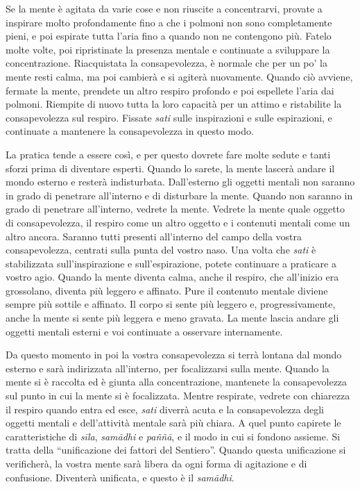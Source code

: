 Se la mente è agitata da varie cose e non riuscite a concentrarvi,
provate a inspirare molto profondamente fino a che i polmoni non sono
completamente pieni, e poi espirate tutta l'aria fino a quando non ne
contengono più. Fatelo molte volte, poi ripristinate la presenza mentale
e continuate a sviluppare la concentrazione. Riacquistata la
consapevolezza, è normale che per un po' la mente resti calma, ma poi
cambierà e si agiterà nuovamente. Quando ciò avviene, fermate la mente,
prendete un altro respiro profondo e poi espellete l'aria dai polmoni.
Riempite di nuovo tutta la loro capacità per un attimo e ristabilite la
consapevolezza sul respiro. Fissate \emph{sati} sulle inspirazioni e
sulle espirazioni, e continuate a mantenere la consapevolezza in questo
modo.

La pratica tende a essere così, e per questo dovrete fare molte sedute e
tanti sforzi prima di diventare esperti. Quando lo sarete, la mente
lascerà andare il mondo esterno e resterà indisturbata. Dall'esterno gli
oggetti mentali non saranno in grado di penetrare all'interno e di
disturbare la mente. Quando non saranno in grado di penetrare
all'interno, vedrete la mente. Vedrete la mente quale oggetto di
consapevolezza, il respiro come un altro oggetto e i contenuti mentali
come un altro ancora. Saranno tutti presenti all'interno del campo della
vostra consapevolezza, centrati sulla punta del vostro naso. Una volta
che \emph{sati} è stabilizzata sull'inspirazione e sull'espirazione,
potete continuare a praticare a vostro agio. Quando la mente diventa
calma, anche il respiro, che all'inizio era grossolano, diventa più
leggero e affinato. Pure il contenuto mentale diviene sempre più sottile
e affinato. Il corpo si sente più leggero e, progressivamente, anche la
mente si sente più leggera e meno gravata. La mente lascia andare gli
oggetti mentali esterni e voi continuate a osservare internamente.

Da questo momento in poi la vostra consapevolezza si terrà lontana dal
mondo esterno e sarà indirizzata all'interno, per focalizzarsi sulla
mente. Quando la mente si è raccolta ed è giunta alla concentrazione,
mantenete la consapevolezza sul punto in cui la mente si è focalizzata.
Mentre respirate, vedrete con chiarezza il respiro quando entra ed esce,
\emph{sati} diverrà acuta e la consapevolezza degli oggetti mentali e
dell'attività mentale sarà più chiara. A quel punto capirete le
caratteristiche di \emph{sīla}, \emph{samādhi} e \emph{paññā}, e il modo
in cui si fondono assieme. Si tratta della ``unificazione dei fattori
del Sentiero''. Quando questa unificazione si verificherà, la vostra
mente sarà libera da ogni forma di agitazione e di confusione. Diventerà
unificata, e questo è il \emph{samādhi}.


